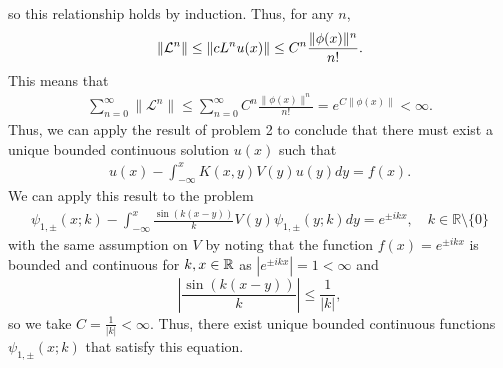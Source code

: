 \documentclass{article}
\begin{document}
so this relationship holds by induction. Thus, for any $n$, 
\[
\|{\cal L}^n\|\leq\|cL^n u(x)\|\leq C^n\frac{\|\phi(x)\|^n}{n!}.
\]
This means that 
\begin{align*}
\sum_{n=0}^\infty \| \mathcal L^n \| \leq \sum_{n=0}^\infty C^n\frac{\|\phi(x)\|^n}{n!}=e^{C\|\phi(x)\|}<\infty.
\end{align*}
Thus, we can apply the result of problem 2 to conclude that there must exist a unique bounded continuous solution $u(x)$ such that 
  \begin{align*}
    u(x) - \int_{-\infty}^x K(x,y) V(y) u(y) d y = f(x).
  \end{align*}
We can apply this result to the problem 
  \begin{align*}
    \psi_{1,\pm}(x;k) - \int_{-\infty}^x \frac{\sin(k (x-y))}{k} V(y) \psi_{1,\pm}(y;k) d y = e^{\pm i k x}, \quad k \in \mathbb R \setminus \{0\}
  \end{align*}
with the same assumption on $V$ by noting that the function $f(x)=e^{\pm i k x}$ is bounded and continuous for $k,x\in\mathbb{R}$ as $|e^{\pm i k x}|=1<\infty$ and 
\[
\left|\frac{\sin(k (x-y))}{k}\right|\leq\frac{1}{|k|},
\]
so we take $C=\frac{1}{|k|}<\infty$. Thus, there exist unique bounded continuous functions $\psi_{1,\pm}(x;k)$ that satisfy this equation.  
\end{document}
